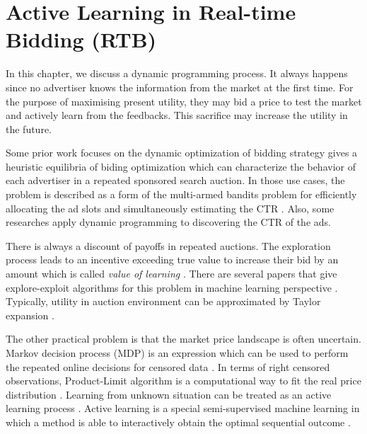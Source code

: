 \chapter{Active Learning in Real-time Bidding (RTB)}
\label{chapterlabel4}

In this chapter, we discuss a dynamic programming process. It always happens since no advertiser knows the information from the market at the first time. For the purpose of maximising present utility, they may bid a price to test the market and actively learn from the feedbacks. This sacrifice may increase the utility in the future.

Some prior work focuses on the dynamic optimization of bidding strategy  \cite{christianborgsjenniferchayesomidetesaminicoleimmorlicakamaljainmohammadmahdian2007} gives a 
heuristic equilibria of biding optimization which can characterize the behavior of each advertiser in a repeated sponsored search auction. In those use cases, the problem is described as a form of the multi-armed bandits problem for efficiently allocating the ad slots and simultaneously estimating the CTR \cite{peterauernicolocesabianchipaulfischer2002}. Also, some researches apply dynamic programming to discovering the CTR of the ads. 

There is always a discount of payoffs in repeated auctions. The exploration process leads to an incentive exceeding true value to increase their bid by an amount which is called \emph{value of learning} \cite{saiminglimohammadmahdianr.prestonmcafee2010}. There are several papers that give explore-exploit algorithms for this problem in machine learning perspective \cite{deepakagarwalbeechungchenpradheepelango2009}. Typically, utility in auction environment can be approximated by Taylor expansion \cite{patrickhummelr.prestonmcafee2014}. 

The other practical problem is that the market price landscape is often uncertain. Markov decision process (MDP) is an expression which can be used to perform the repeated online decisions for censored data \cite{Amin_budgetoptimization, ivantajduharbojanadalbeloba2012}. In terms of right censored observations, Product-Limit algorithm is a computational way to fit the real price distribution \cite{e.l.kaplanpaulmeier1958}. Learning from unknown situation can be treated as an active learning process \cite{robertzeithammer2007}. Active learning is a special semi-supervised machine learning in which a method is able to interactively obtain the optimal sequential outcome \cite{burrsettles2010}.

